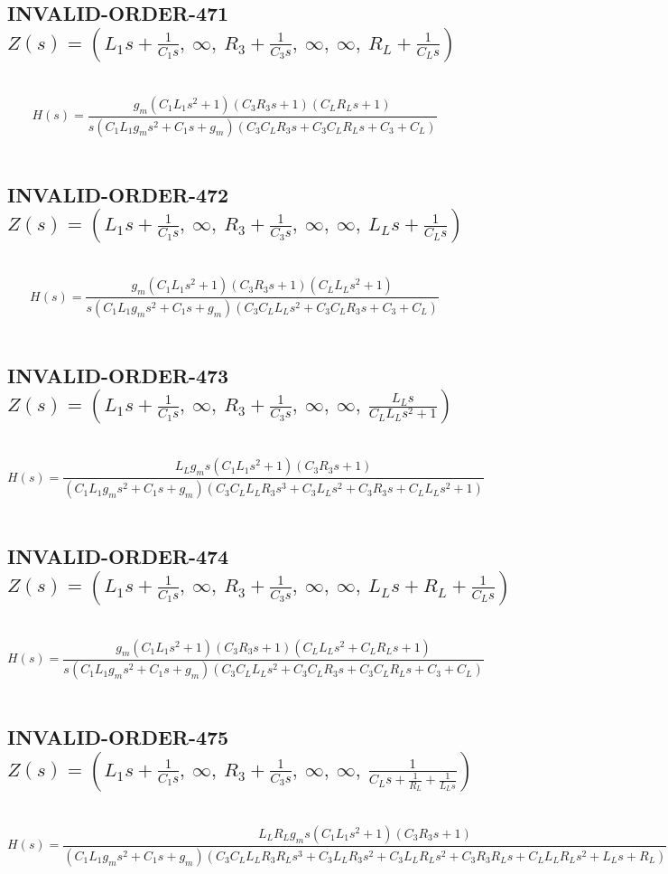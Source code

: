 \documentclass{article}
\begin{document}
\subsection{INVALID-ORDER-471 $Z(s) = \left( L_{1} s + \frac{1}{C_{1} s}, \  \infty, \  R_{3} + \frac{1}{C_{3} s}, \  \infty, \  \infty, \  R_{L} + \frac{1}{C_{L} s}\right)$ } \ 
\textbf{\[H(s) = \frac{g_{m} \left(C_{1} L_{1} s^{2} + 1\right) \left(C_{3} R_{3} s + 1\right) \left(C_{L} R_{L} s + 1\right)}{s \left(C_{1} L_{1} g_{m} s^{2} + C_{1} s + g_{m}\right) \left(C_{3} C_{L} R_{3} s + C_{3} C_{L} R_{L} s + C_{3} + C_{L}\right)}\] } \ 
\subsection{INVALID-ORDER-472 $Z(s) = \left( L_{1} s + \frac{1}{C_{1} s}, \  \infty, \  R_{3} + \frac{1}{C_{3} s}, \  \infty, \  \infty, \  L_{L} s + \frac{1}{C_{L} s}\right)$ } \ 
\textbf{\[H(s) = \frac{g_{m} \left(C_{1} L_{1} s^{2} + 1\right) \left(C_{3} R_{3} s + 1\right) \left(C_{L} L_{L} s^{2} + 1\right)}{s \left(C_{1} L_{1} g_{m} s^{2} + C_{1} s + g_{m}\right) \left(C_{3} C_{L} L_{L} s^{2} + C_{3} C_{L} R_{3} s + C_{3} + C_{L}\right)}\] } \ 
\subsection{INVALID-ORDER-473 $Z(s) = \left( L_{1} s + \frac{1}{C_{1} s}, \  \infty, \  R_{3} + \frac{1}{C_{3} s}, \  \infty, \  \infty, \  \frac{L_{L} s}{C_{L} L_{L} s^{2} + 1}\right)$ } \ 
\textbf{\[H(s) = \frac{L_{L} g_{m} s \left(C_{1} L_{1} s^{2} + 1\right) \left(C_{3} R_{3} s + 1\right)}{\left(C_{1} L_{1} g_{m} s^{2} + C_{1} s + g_{m}\right) \left(C_{3} C_{L} L_{L} R_{3} s^{3} + C_{3} L_{L} s^{2} + C_{3} R_{3} s + C_{L} L_{L} s^{2} + 1\right)}\] } \ 
\subsection{INVALID-ORDER-474 $Z(s) = \left( L_{1} s + \frac{1}{C_{1} s}, \  \infty, \  R_{3} + \frac{1}{C_{3} s}, \  \infty, \  \infty, \  L_{L} s + R_{L} + \frac{1}{C_{L} s}\right)$ } \ 
\textbf{\[H(s) = \frac{g_{m} \left(C_{1} L_{1} s^{2} + 1\right) \left(C_{3} R_{3} s + 1\right) \left(C_{L} L_{L} s^{2} + C_{L} R_{L} s + 1\right)}{s \left(C_{1} L_{1} g_{m} s^{2} + C_{1} s + g_{m}\right) \left(C_{3} C_{L} L_{L} s^{2} + C_{3} C_{L} R_{3} s + C_{3} C_{L} R_{L} s + C_{3} + C_{L}\right)}\] } \ 
\subsection{INVALID-ORDER-475 $Z(s) = \left( L_{1} s + \frac{1}{C_{1} s}, \  \infty, \  R_{3} + \frac{1}{C_{3} s}, \  \infty, \  \infty, \  \frac{1}{C_{L} s + \frac{1}{R_{L}} + \frac{1}{L_{L} s}}\right)$ } \ 
\textbf{\[H(s) = \frac{L_{L} R_{L} g_{m} s \left(C_{1} L_{1} s^{2} + 1\right) \left(C_{3} R_{3} s + 1\right)}{\left(C_{1} L_{1} g_{m} s^{2} + C_{1} s + g_{m}\right) \left(C_{3} C_{L} L_{L} R_{3} R_{L} s^{3} + C_{3} L_{L} R_{3} s^{2} + C_{3} L_{L} R_{L} s^{2} + C_{3} R_{3} R_{L} s + C_{L} L_{L} R_{L} s^{2} + L_{L} s + R_{L}\right)}\] } \ 
\end{document}
